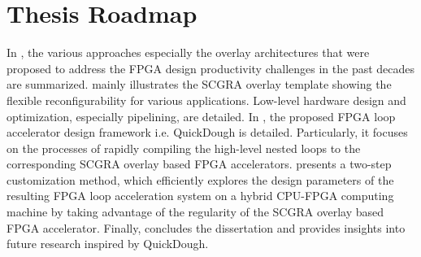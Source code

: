 \section{Thesis Roadmap}
In , the various approaches especially the overlay architectures that were proposed to address the FPGA design productivity challenges in the past decades are summarized.  mainly illustrates the SCGRA overlay template showing the flexible reconfigurability for various applications. Low-level hardware design and optimization, especially pipelining, are detailed. In , the proposed FPGA loop accelerator design framework i.e. QuickDough is detailed. Particularly, it focuses on the processes of rapidly compiling the high-level nested loops to the corresponding SCGRA overlay based FPGA accelerators.  presents a two-step customization method, which efficiently explores the design parameters of the resulting FPGA loop acceleration system on a hybrid CPU-FPGA computing machine by taking advantage of the regularity of the SCGRA overlay based FPGA accelerator. Finally,  concludes the dissertation and provides insights into future research inspired by QuickDough.
